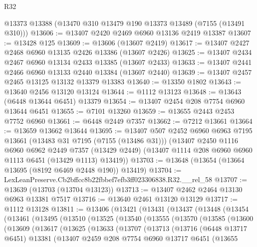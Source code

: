 \begin{lexlean}{R32}
\begin{coremodule}
    @13373
    @13388
    (@13470 @310 @13479 @190 @13373 @13489 (@7155 (@13491 @310)))
@13606 := @13407 @2420 @2469 @6960 @13136 @2419 @13387
@13607 := @13428 @125
@13609 := @13606 (@13607 @2419)
@13617 := @13407 @2427 @2468 @6960 @13135 @2426 @13386 (@13607 @2426)
@13625 := @13407 @2434 @2467 @6960 @13134 @2433 @13385 (@13607 @2433)
@13633 := @13407 @2441 @2466 @6960 @13133 @2440 @13384 (@13607 @2440)
@13639 := @13407 @2457 @2465 @13125 @13132 @13379 @13383
@13640 := @13350 @1802
@13643 := @13640 @2456 @13120 @13124
@13644 := @1112 @13123
@13648 := @13643 (@6448 @13644 @6451) @13379
@13654 := @13407 @2454 @208 @7754 @6960 @13644 @6451
@13655 := @7101 @13260
@13659 := @13655 @2443 @2453 @7752 @6960
@13661 := @6448 @2449 @7357
@13662 := @7212 @13661
@13664 := @13659 @13662 @13644
@13695 := @13407
    @507
    @2452
    @6960
    @6963
    @7195
    @13661
    (@13483 @31 @7195 (@7155 (@13486 @31)))
    (@13407
      @2450
      @1116
      @6960
      @6962
      @2449
      @7357
      (@13429 @2449)
      (@13407 @1114 @208 @6960 @6960 @1113 @6451 (@13429 @1113) @13419))
@13703 := @13648 (@13654 (@13664 @13695 (@8192 @6469 @2448 @190)) @13419)
@13704 := LexLeanPreserve.Cb2bffcc8b22fbbef7efb3ff023306838.R32.__rel_58
@13707 := @13639 (@13703 (@13704 @13123))
@13713 := @13407 @2462 @2464 @13130 @6963 @13381 @7517
@13716 := @13640 @2461 @13120 @13129
@13717 := @1112 @13128
@13811 := @13406
    (@13421
      (@13431
        (@13437
          (@13448
            (@13454
              (@13461
                (@13495
                  (@13510
                    (@13525
                      (@13540
                        (@13555
                          (@13570
                            (@13585
                              (@13600
                                (@13609
                                  (@13617
                                    (@13625
                                      (@13633
                                        (@13707
                                          (@13713
                                            (@13716
                                              (@6448 @13717 @6451)
                                              @13381
                                              (@13407
                                                @2459
                                                @208
                                                @7754
                                                @6960
                                                @13717
                                                @6451
                                                (@13655

\end{coremodule}
\end{lexlean}
